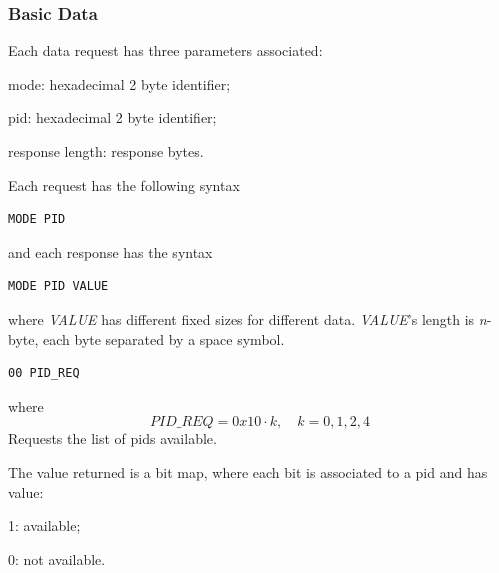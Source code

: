 \documentclass[twoside]{article}
\begin{document}
\begin{multicols}{2}
\subsubsection{Basic Data}

Each data request has three parameters associated:
\begin{compactitem}
  \item mode: hexadecimal 2 byte identifier;
  \item pid: hexadecimal 2 byte identifier;
  \item response length: response bytes.
\end{compactitem}

Each request has the following syntax
\begin{lstlisting}[language=bash]
MODE PID
\end{lstlisting}
and each response has the syntax
\begin{lstlisting}[language=bash]
MODE PID VALUE
\end{lstlisting}
where \emph{VALUE} has different fixed sizes for different data.
\emph{VALUE}'s length is \emph{n}-byte, each byte separated by a space symbol.

\begin{lstlisting}[language=bash]
00 PID_REQ
\end{lstlisting}

where
\begin{equation}
PID\_REQ = 0x10 \cdot k , \quad k = 0,1,2,4
\end{equation}
Requests the list of pids available.

The value returned is a bit map, where each bit is associated to a pid and has value:
\begin{compactitem}
  \item 1: available;
  \item 0: not available.
\end{compactitem}



\end{multicols}
\end{document}
